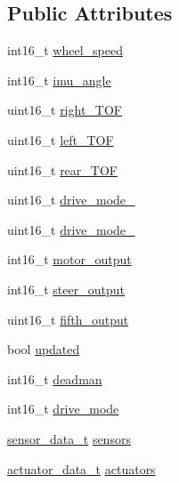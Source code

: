 \subsection*{Public Attributes}
\begin{DoxyCompactItemize}
\item 
int16\+\_\+t \hyperlink{structsystem__data__t_aee87dc3d6b863923bd540334bdaf7198}{wheel\+\_\+speed}
\item 
int16\+\_\+t \hyperlink{structsystem__data__t_a4a161245589e538f2dbf1f888bb06857}{imu\+\_\+angle}
\item 
uint16\+\_\+t \hyperlink{structsystem__data__t_a05ff19dd9bbb2935149dcfa9315f8b6e}{right\+\_\+\+T\+OF}
\item 
uint16\+\_\+t \hyperlink{structsystem__data__t_a664969580339c409aeec2e53c7f7208c}{left\+\_\+\+T\+OF}
\item 
uint16\+\_\+t \hyperlink{structsystem__data__t_a204de6b964d546015c89e985536a74f4}{rear\+\_\+\+T\+OF}
\item 
uint16\+\_\+t \hyperlink{structsystem__data__t_a9fe4bade316d8e0c28fadb24577b146e}{drive\+\_\+mode\+\_}
\item 
uint16\+\_\+t \hyperlink{structsystem__data__t_a26e996fd84c3c87ddac3b2895ea3685e}{drive\+\_\+mode\+\_}
\item 
int16\+\_\+t \hyperlink{structsystem__data__t_a55efc5a76bae9ae7b9b45e13b5eeb994}{motor\+\_\+output}
\item 
int16\+\_\+t \hyperlink{structsystem__data__t_adb14fc1061a46141fc31c93bbe654d1a}{steer\+\_\+output}
\item 
uint16\+\_\+t \hyperlink{structsystem__data__t_a39264c99abb0352fd753848338b550ec}{fifth\+\_\+output}
\item 
bool \hyperlink{structsystem__data__t_a6ea67f53cc727010fd3c19082a42f15f}{updated}
\item 
int16\+\_\+t \hyperlink{structsystem__data__t_acb1f4d615fa9f230fd9a55081b41be53}{deadman}
\item 
int16\+\_\+t \hyperlink{structsystem__data__t_a9fe0717b793ec25c2941eb580540b658}{drive\+\_\+mode}
\item 
\hyperlink{structsensor__data__t}{sensor\+\_\+data\+\_\+t} \hyperlink{structsystem__data__t_a4d59d16a53e21eaba5f9c7212c8d0e63}{sensors}
\item 
\hyperlink{structactuator__data__t}{actuator\+\_\+data\+\_\+t} \hyperlink{structsystem__data__t_a3887ae8b12fbc3ae54b0a89c0f1af1ac}{actuators}
\end{DoxyCompactItemize}


